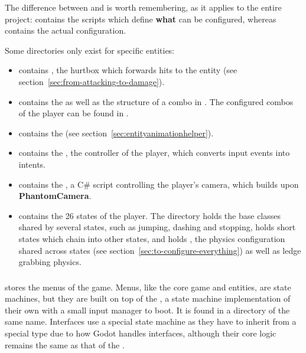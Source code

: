 \documentclass[../Main.tex]{subfiles}
\begin{document}
The difference between  and  is worth remembering, as it applies to the entire project:  contains the scripts which define \textbf{what} can be configured, whereas  contains the actual configuration.

Some directories only exist for specific entities:

\begin{itemize}
    \item {} contains , the hurtbox which forwards hits to the entity (see section~\ref{sec:from-attacking-to-damage}).
    \item {} contains the  as well as the structure of a combo in . The configured combos of the player can be found in .
    \item {} contains the  (see section~\ref{sec:entityanimationhelper}).
    \item {} contains the , the controller of the player, which converts input events into intents.
    \item {} contains the , a C\# script controlling the player's camera, which builds upon \textbf{PhantomCamera}.
    \item {} contains the 26 states of the player. The directory  holds the base classes shared by several states, such as jumping, dashing and stopping,  holds short states which chain into other states, and  holds , the physics configuration shared across states (see section~\ref{sec:to-configure-everything}) as well as ledge grabbing physics.
\end{itemize}

\subsubsection{}\label{sec:interfaces}

 stores the menus of the game. Menus, like the core game and entities, are state machines, but they are built on top of the , a state machine implementation of their own with a small input manager to boot. It is found in a directory of the same name. Interfaces use a special state machine as they have to inherit from a special  type due to how Godot handles interfaces, although their core logic remains the same as that of the .
\end{document}

